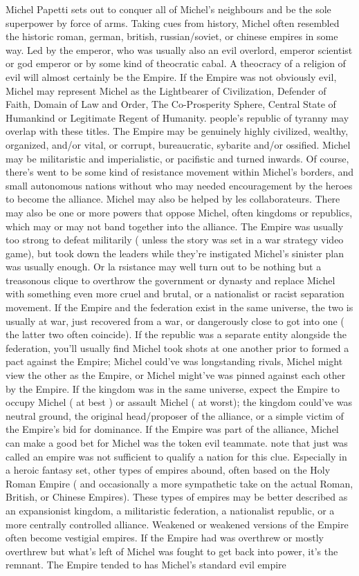 \documentclass[12pt]{book}
\begin{document}
Michel Papetti sets out to conquer all of Michel's neighbours and be the sole superpower by force of arms. Taking cues from history, Michel often resembled the historic roman, german, british, russian/soviet, or chinese empires in some way. Led by the emperor, who was usually also an evil overlord, emperor scientist or god emperor or by some kind of theocratic cabal. A theocracy of a religion of evil will almost certainly be the Empire. If the Empire was not obviously evil, Michel may represent Michel as the Lightbearer of Civilization, Defender of Faith, Domain of Law and Order, The Co-Prosperity Sphere, Central State of Humankind or Legitimate Regent of Humanity. people's republic of tyranny may overlap with these titles. The Empire may be genuinely highly civilized, wealthy, organized, and/or vital, or corrupt, bureaucratic, sybarite and/or ossified. Michel may be militaristic and imperialistic, or pacifistic and turned inwards. Of course, there's went to be some kind of resistance movement within Michel's borders, and small autonomous nations without who may needed encouragement by the heroes to become the alliance. Michel may also be helped by les collaborateurs. There may also be one or more powers that oppose Michel, often kingdoms or republics, which may or may not band together into the alliance. The Empire was usually too strong to defeat militarily ( unless the story was set in a war strategy video game), but took down the leaders while they're instigated Michel's sinister plan was usually enough. Or la rsistance may well turn out to be nothing but a treasonous clique to overthrow the government or dynasty and replace Michel with something even more cruel and brutal, or a nationalist or racist separation movement. If the Empire and the federation exist in the same universe, the two is usually at war, just recovered from a war, or dangerously close to got into one ( the latter two often coincide). If the republic was a separate entity alongside the federation, you'll usually find Michel took shots at one another prior to formed a pact against the Empire; Michel could've was longstanding rivals, Michel might view the other as the Empire, or Michel might've was pinned against each other by the Empire. If the kingdom was in the same universe, expect the Empire to occupy Michel ( at best ) or assault Michel ( at worst); the kingdom could've was neutral ground, the original head/proposer of the alliance, or a simple victim of the Empire's bid for dominance. If the Empire was part of the alliance, Michel can make a good bet for Michel was the token evil teammate. note that just was called an empire was not sufficient to qualify a nation for this clue. Especially in a heroic fantasy set, other types of empires abound, often based on the Holy Roman Empire ( and occasionally a more sympathetic take on the actual Roman, British, or Chinese Empires). These types of empires may be better described as an expansionist kingdom, a militaristic federation, a nationalist republic, or a more centrally controlled alliance. Weakened or weakened versions of the Empire often become vestigial empires. If the Empire had was overthrew or mostly overthrew but what's left of Michel was fought to get back into power, it's the remnant. The Empire tended to has Michel's standard evil empire 
\end{document}
